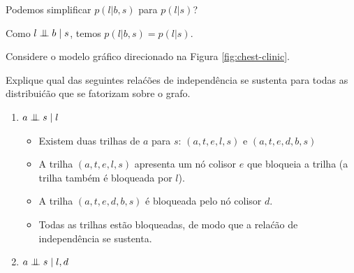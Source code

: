 \begin{exenumerate}
\begin{enumerate}
    \end{enumerate}
    
    \item Podemos simplificar $p(l|b,s)$ para $p(l|s)$?
    
    \begin{solution}
        Como $l \mathrel{\perp\mspace{-10mu}\perp} b \mid s$, temos $p(l|b,s) = p(l|s)$.
    \end{solution}
    
\end{exenumerate}


\label{ex:chest-clinic2}
Considere o modelo gr\'afico direcionado na Figura \ref{fig:chest-clinic}.

\begin{exenumerate}
    \item Explique qual das seguintes rela\'c\~oes de independ\^encia se sustenta para todas as distribui\'c\~ao que se fatorizam sobre o grafo.
    \begin{enumerate}
        \item $a \mathrel{\perp\mspace{-10mu}\perp} s \mid l$
        \begin{solution}
            \begin{itemize}
                \item Existem duas trilhas de $a$ para $s$: $(a,t,e,l,s)$ e $(a,t,e,d,b,s)$
                \item A trilha $(a,t,e,l,s)$ apresenta um n\'o colisor $e$ que bloqueia a trilha (a trilha tamb\'em \'e bloqueada por $l$).
                \item A trilha $(a,t,e,d,b,s)$ \'e bloqueada pelo n\'o colisor $d$. 
                \item Todas as trilhas est\~ao bloqueadas, de modo que a rela\'c\~ao de independ\^encia se sustenta.
            \end{itemize}
        \end{solution}
        
        \item $a \mathrel{\perp\mspace{-10mu}\perp} s \mid l, d$
        

\end{enumerate}
\end{exenumerate}
